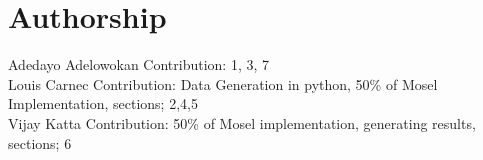 \documentclass[a4paper,11pt]{article}
\begin{document}
\section*{Authorship}

Adedayo Adelowokan Contribution: 1, 3, 7 \\
\newline
Louis Carnec Contribution: Data Generation in python, 50\% of Mosel Implementation, sections; 2,4,5 \\
\newline
Vijay Katta Contribution: 50\% of Mosel implementation, generating results, sections; 6 \\


\clearpage


\end{document}
